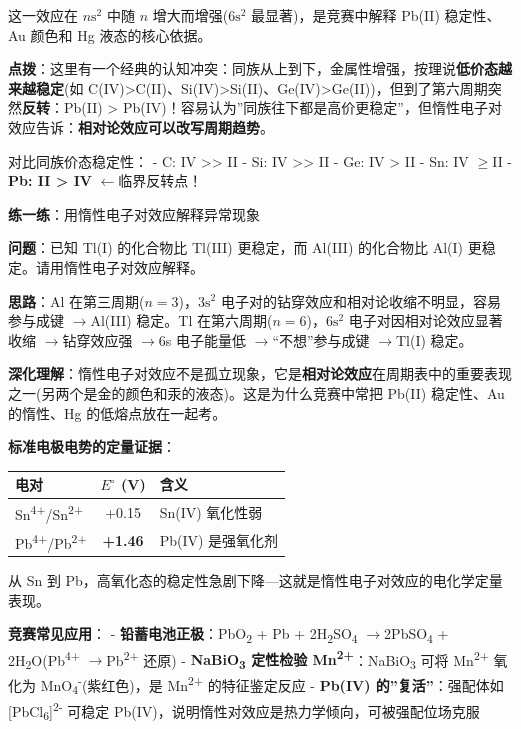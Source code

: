\documentclass[a4paper,11pt]{ctexart}
\newcounter{none}
\newcommand{\箭}{\ensuremath{\rightarrow}}
\newcommand{\左箭}{\ensuremath{\leftarrow}}
\newcommand{\上箭}{\ensuremath{\uparrow}}
\newcommand{\下箭}{\ensuremath{\downarrow}}
\newcommand{\衡}{\ensuremath{\rightleftharpoons}}
\newcommand{\双箭}{\ensuremath{\leftrightarrow}}
\newcommand{\约等于}{\ensuremath{\approx}}
\newcommand{\小于等于}{\ensuremath{\leq}}
\newcommand{\大于等于}{\ensuremath{\geq}}
\newcommand{\不等于}{\ensuremath{\neq}}
\newcommand{\西格马}{\ensuremath{\sigma}}
\newcommand{\派}{\ensuremath{\pi}}
\begin{document}
这一效应在 \(n\mathrm{s}^2\) 中随 \(n\) 增大而增强(\(6\mathrm{s}^2\) 最显著)，是竞赛中解释 Pb(II) 稳定性、Au 颜色和 Hg 液态的核心依据。

\textbf{点拨}：这里有一个经典的认知冲突：同族从上到下，金属性增强，按理说\textbf{低价态越来越稳定}(如 C(IV)\textgreater C(II)、Si(IV)\textgreater Si(II)、Ge(IV)\textgreater Ge(II))，但到了第六周期突然\textbf{反转}：Pb(II) \textgreater{} Pb(IV)！容易认为''同族往下都是高价更稳定''，但惰性电子对效应告诉：\textbf{相对论效应可以改写周期趋势}。

对比同族价态稳定性：
- C: IV \textgreater\textgreater{} II
- Si: IV \textgreater\textgreater{} II
- Ge: IV \textgreater{} II
- Sn: IV \大于等于 II
- \textbf{Pb: II \textgreater{} IV} \左箭 临界反转点！

\textbf{练一练}：用惰性电子对效应解释异常现象

\textbf{问题}：已知 Tl(I) 的化合物比 Tl(III) 更稳定，而 Al(III) 的化合物比 Al(I) 更稳定。请用惰性电子对效应解释。

\textbf{思路}：Al 在第三周期(\(n=3\))，\(3\mathrm{s}^2\) 电子对的钻穿效应和相对论收缩不明显，容易参与成键 \箭 Al(III) 稳定。Tl 在第六周期(\(n=6\))，\(6\mathrm{s}^2\) 电子对因相对论效应显著收缩 \箭 钻穿效应强 \箭 6s 电子能量低 \箭 ``不想''参与成键 \箭 Tl(I) 稳定。

\textbf{深化理解}：惰性电子对效应不是孤立现象，它是\textbf{相对论效应}在周期表中的重要表现之一(另两个是金的颜色和汞的液态)。这是为什么竞赛中常把 Pb(II) 稳定性、Au 的惰性、Hg 的低熔点放在一起考。

\textbf{标准电极电势的定量证据}：

{\def\LTcaptype{none} %
\begin{longtable}[]{@{}lcl@{}}
\toprule\noalign{}
电对 & \(E^\circ\) (V) & 含义 \\
\midrule\noalign{}
\endhead
\bottomrule\noalign{}
\endlastfoot
Sn\textsuperscript{4+}/Sn\textsuperscript{2+} & +0.15 & Sn(IV) 氧化性弱 \\
Pb\textsuperscript{4+}/Pb\textsuperscript{2+} & \textbf{+1.46} & Pb(IV) 是强氧化剂 \\
\end{longtable}
}

从 Sn 到 Pb，高氧化态的稳定性急剧下降---这就是惰性电子对效应的电化学定量表现。

\textbf{竞赛常见应用}：
- \textbf{铅蓄电池正极}：PbO\textsubscript{2} + Pb + 2H\textsubscript{2}SO\textsubscript{4} \箭 2PbSO\textsubscript{4} + 2H\textsubscript{2}O(Pb\textsuperscript{4+} \箭 Pb\textsuperscript{2+} 还原)
- \textbf{NaBiO\textsubscript{3} 定性检验 Mn\textsuperscript{2+}}：NaBiO\textsubscript{3} 可将 Mn\textsuperscript{2+} 氧化为 MnO\textsubscript{4}\textsuperscript{-}(紫红色)，是 Mn\textsuperscript{2+} 的特征鉴定反应
- \textbf{Pb(IV) 的''复活''}：强配体如 {[}PbCl\textsubscript{6}{]}\textsuperscript{2-} 可稳定 Pb(IV)，说明惰性对效应是热力学倾向，可被强配位场克服
\end{document}

